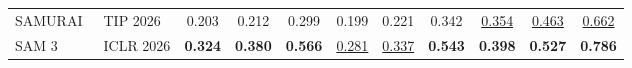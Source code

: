 \begin{table}[t]
{\begin{tabular}{l l ccc ccc ccc}
SAMURAI~\cite{yang2026samurai}     & TIP 2026   & 0.203             & 0.212             & 0.299             & 0.199             & 0.221             & 0.342             & \underline{0.354} & \underline{0.463} & \underline{0.662} \\
SAM 3~\cite{carion2026sam3}        & ICLR 2026  & \textbf{0.324}    & \textbf{0.380}    & \textbf{0.566}    & \underline{0.281} & \underline{0.337} & \textbf{0.543}    & \textbf{0.398}    & \textbf{0.527}    & \textbf{0.786}    \\
\bottomrule
\end{tabular}
}
\end{table}
